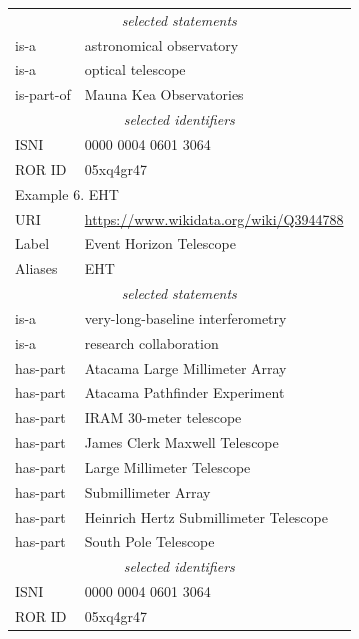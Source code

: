 \documentclass[11pt,a4paper]{ivoa}
\begin{document}
\begin{longtable}{p{}p{}}
\multicolumn{2}{c}{\sl selected statements}\\
is-a & astronomical observatory \\
is-a & optical telescope \\
is-part-of & Mauna Kea Observatories\\
\multicolumn{2}{c}{\sl selected identifiers}\\
ISNI       & 0000 0004 0601 3064\\
ROR ID     & 05xq4gr47 \\
\hline
\hline
\multicolumn{2}{l}{Example 6. EHT}\\
\hline
URI & \url{https://www.wikidata.org/wiki/Q3944788}\\
Label      & Event Horizon Telescope\\
Aliases    & EHT\\
\multicolumn{2}{c}{\sl selected statements}\\
is-a & very-long-baseline interferometry \\
is-a & research collaboration \\
has-part & Atacama Large Millimeter Array\\
has-part & Atacama Pathfinder Experiment\\
has-part & IRAM 30-meter telescope\\
has-part & James Clerk Maxwell Telescope\\
has-part & Large Millimeter Telescope\\
has-part & Submillimeter Array\\
has-part & Heinrich Hertz Submillimeter Telescope\\
has-part & South Pole Telescope\\ 
\multicolumn{2}{c}{\sl selected identifiers}\\
ISNI       & 0000 0004 0601 3064\\
ROR ID     & 05xq4gr47 \\
\hline
\end{longtable}
\end{document}
